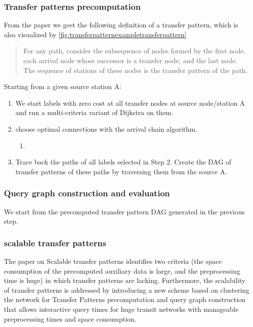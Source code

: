 \subsubsection{Transfer patterns precomputation}
From the paper \cite{bast_fast_2010} we geet the following definition of a transfer pattern, which is also visualized by \autoref{fig:transferpatternexampletransferpattern}
\begin{quote}
    For any path, consider the subsequence of nodes formed by the first node, each arrival node whose successor is a transfer node, and the last node. The sequence of stations of these nodes is the transfer pattern of the path.
\end{quote}

Starting from a given source station A:
\begin{enumerate}
    \item We start labels with zero cost at all transfer nodes at source node/station A and run a multi-criteria variant of Dijkstra on them.
    \item choose optimal connections with the arrival chain algorithm.
    \begin{enumerate}
        \item 
    \end{enumerate}
    \item Trace back the paths of all labels selected in Step 2. Create the DAG of transfer patterns of these paths by traversing them from the source A.
\end{enumerate}
\subsubsection{Query graph construction and evaluation}
We start from the precomputed transfer pattern DAG generated in the previous step.  
\subsubsection{scalable transfer patterns}
The paper on Scalable transfer patterns \cite{bast_scalable_2015} identifies two criteria (the space consumption of the precomputed auxiliary data is large, and the preprocessing time is huge) in which transfer patterns are lacking. Furthermore, the scalability of transfer patterns is addressed by introducing a new scheme based on clustering the network for Transfer Patterns precomputation and query graph construction that allows interactive query times for huge transit networks with manageable preprocessing times and space consumption. 
